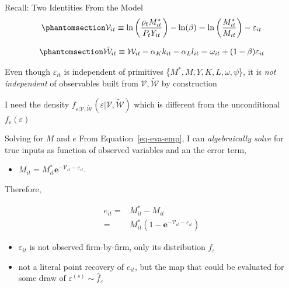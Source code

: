 \documentclass[
  ignorenonframetext,
  aspectratio=169,
]{beamer}
\providecommand{\tightlist}{%
  \setlength{\itemsep}{0pt}\setlength{\parskip}{0pt}}
\begin{document}
\begin{frame}{Recall: Two Identities From the Model}
\protect{}\label{recall-two-identities-from-the-model}
\begin{equation}\protect\phantomsection\label{eq-eva-emp}{
\mathcal{V}_{it} \equiv \ln\left(\frac{\rho_t M^*_{it}}{P_tY_{it}}\right)-\ln(\beta) = \ln\left(\frac{M^*_{it}}{M_{it}}\right)-\varepsilon_{it}
}\end{equation}

\begin{equation}\protect\phantomsection\label{eq-tilde-big-w}{
\tilde{\mathcal{W}}_{it}\equiv \mathcal{W}_{it}-\alpha_K k_{it}-\alpha_L l_{it}=\omega_{it}+(1-\beta)\varepsilon_{it}
}\end{equation}

Even though \(\varepsilon_{it}\) is independent of primitives
\{\(M^*, M, Y, K, L, \omega, \psi\)\}, it is \emph{not independent} of
observables built from \(\mathcal{V},\tilde{\mathcal{W}}\) by
construction

I need the density
\(f_{\varepsilon|\mathcal{V},\tilde{\mathcal{W}}}(\varepsilon|\mathcal{V},\tilde{\mathcal{W}})\)
which is different from the unconditional
\(f_{\varepsilon}(\varepsilon)\)
\end{frame}

\begin{frame}{Solving for \(M\) and \(e\)}
\protect{}\label{solving-for-m-and-e}
From Equation~\ref{eq-eva-emp}, I can \emph{algebraically solve} for
true inputs as function of observed variables and an the error term,

\begin{itemize}
\tightlist
\item
  \(M_{it}=M^*_{it}\textbf{e}^{-\mathcal{V}_{it}-\varepsilon_{it}}\).
\end{itemize}

Therefore,

\[
\begin{aligned}
    e_{it}=&M^*_{it}-M_{it}\\
    =&M^*_{it}\left(1-\textbf{e}^{-\mathcal{V}_{it}-\varepsilon_{it}}\right)
\end{aligned}
\]

\begin{itemize}
\tightlist
\item
  \(\varepsilon_{it}\) is not observed firm-by-firm, only its
  distribution \(f_\varepsilon\)
\item
  not a literal point recovery of \(e_{it}\), but the map that could be
  evaluated for some draw of \(\varepsilon^{(s)}\sim\hat f_\varepsilon\)
\end{itemize}
\end{frame}
\end{document}
